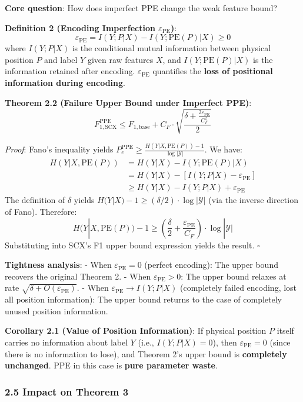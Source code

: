 \documentclass[
  12pt,
]{article}
\begin{document}
\textbf{Core question}: How does imperfect PPE change the weak feature bound?

\textbf{Definition 2 (Encoding Imperfection $\varepsilon_{\text{PE}}$)}:
\[\boxed{\varepsilon_{\text{PE}} = I(Y; P | X) - I(Y; \text{PE}(P) | X) \geq 0}\]
where $I(Y; P | X)$ is the conditional mutual information between physical position $P$ and label $Y$ given raw features $X$, and $I(Y; \text{PE}(P) | X)$ is the information retained after encoding. $\varepsilon_{\text{PE}}$ quantifies the \textbf{loss of positional information during encoding}.

\textbf{Theorem 2.2 (Failure Upper Bound under Imperfect PPE)}:
\[\boxed{F_{1,\text{SCX}}^{\text{PPE}} \leq F_{1,\text{base}} + C_F \cdot \sqrt{\frac{\delta + \frac{2\varepsilon_{\text{PE}}}{C_F^2}}{2}}}\]

\emph{Proof}: Fano's inequality yields $P_e^{\text{PPE}} \geq \frac{H(Y|X, \text{PE}(P)) - 1}{\log |\mathcal{Y}|}$. We have:
\begin{align*}
H(Y|X, \text{PE}(P)) &= H(Y|X) - I(Y; \text{PE}(P) | X) \\
&= H(Y|X) - [I(Y; P | X) - \varepsilon_{\text{PE}}] \\
&\geq H(Y|X) - I(Y; P | X) + \varepsilon_{\text{PE}}
\end{align*}
The definition of $\delta$ yields $H(Y|X) - 1 \geq (\delta/2) \cdot \log|\mathcal{Y}|$ (via the inverse direction of Fano). Therefore:
\[H(Y|X, \text{PE}(P)) - 1 \geq \left(\frac{\delta}{2} + \frac{\varepsilon_{\text{PE}}}{C_F}\right) \cdot \log|\mathcal{Y}|\]
Substituting into SCX's F1 upper bound expression yields the result. $\square$

\textbf{Tightness analysis}:
- When $\varepsilon_{\text{PE}} = 0$ (perfect encoding): The upper bound recovers the original Theorem 2.
- When $\varepsilon_{\text{PE}} > 0$: The upper bound relaxes at rate $\sqrt{\delta + O(\varepsilon_{\text{PE}})}$.
- When $\varepsilon_{\text{PE}} \to I(Y; P | X)$ (completely failed encoding, lost all position information): The upper bound returns to the case of completely unused position information.

\textbf{Corollary 2.1 (Value of Position Information)}: If physical position $P$ itself carries no information about label $Y$ (i.e., $I(Y; P | X) = 0$), then $\varepsilon_{\text{PE}} = 0$ (since there is no information to lose), and Theorem 2's upper bound is \textbf{completely unchanged}. PPE in this case is \textbf{pure parameter waste}.

\subsubsection{2.5 Impact on Theorem 3}\label{impact-on-theorem-3}
\end{document}
